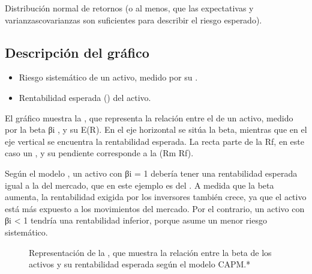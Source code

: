 \documentclass[letterpaper,10pt,spanish]{sphinxmanual}
\begin{document}
\sphinxAtStartPar
Distribución normal de retornos (o al menos, que las expectativas y varianzas\sphinxhyphen{}covarianzas son suficientes para describir el riesgo esperado).


\subsection{Descripción del gráfico}
\label{\detokenize{MarcoTeorico:descripcion-del-grafico}}\begin{itemize}
\item {} 
\sphinxAtStartPar
{} Riesgo sistemático de un activo, medido por su .

\item {} 
\sphinxAtStartPar
{} Rentabilidad esperada () del activo.

\end{itemize}

\sphinxAtStartPar
El gráfico muestra la , que representa la relación entre el  de un activo, medido por la beta βi , y su  E(R). En el eje horizontal se sitúa la beta, mientras que en el eje vertical se encuentra la rentabilidad esperada. La recta parte de la  Rf, en este caso un , y su pendiente corresponde a la  (Rm \sphinxhyphen{} Rf).

\sphinxAtStartPar
Según el modelo , un activo con βi = 1 debería tener una rentabilidad esperada igual a la del mercado, que en este ejemplo es del . A medida que la beta aumenta, la rentabilidad exigida por los inversores también crece, ya que el activo está más expuesto a los movimientos del mercado. Por el contrario, un activo con βi \textless{} 1 tendría una rentabilidad inferior, porque asume un menor riesgo sistemático.

\begin{figure}[htbp]
\centering
\capstart

\noindent{}
\caption{ Representación de la , que muestra la relación entre la beta de los activos y su rentabilidad esperada según el modelo CAPM.*}\label{\detokenize{MarcoTeorico:id3}}\end{figure}
\end{document}
